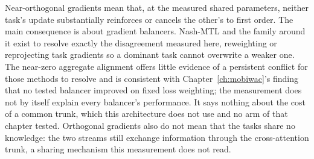 Near-orthogonal gradients mean that, at the measured shared parameters, neither task's update
substantially reinforces or cancels the other's to first order. The
main consequence is about gradient balancers. Nash-MTL and the family around it exist to resolve exactly
the disagreement measured here, reweighting or reprojecting task gradients so a dominant task cannot
overwrite a weaker one. The near-zero aggregate alignment offers little evidence of a persistent
conflict for those methods to resolve and is consistent with Chapter~\ref{ch:mobiwac}'s finding that no
tested balancer improved on fixed loss weighting; the measurement does not by itself explain every
balancer's performance. It says nothing
about the cost of a common trunk, which this architecture does not use and no arm of that chapter
tested. Orthogonal gradients also do not mean that the tasks share no knowledge: the two streams
still exchange information through the cross-attention trunk, a sharing mechanism this measurement
does not read.
